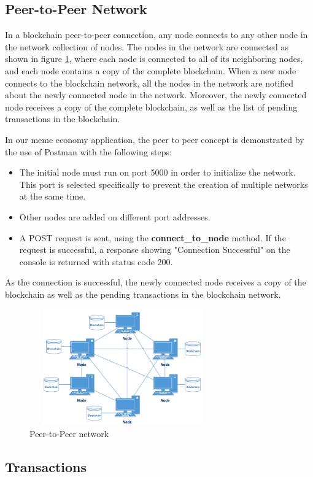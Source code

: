\documentclass[12pt]{article}
\begin{document}
\subsection{Peer-to-Peer Network} %
In a blockchain peer-to-peer connection, any node connects to any other node in the network collection of nodes. The nodes in the network are connected as shown in figure \ref{fig:P2P}, where each node is connected to all of its neighboring nodes, and each node contains a copy of the complete blockchain. When a new node connects to the blockchain network, all the nodes in the network are notified about the newly connected node in the network. Moreover, the newly connected node receives a copy of the complete blockchain, as well as the list of pending transactions in the blockchain. 

In our meme economy application, the peer to peer concept is demonstrated by the use of Postman with the following steps:
\begin{itemize}
    \item The initial node must run on port 5000 in order to initialize the network. This port is selected specifically to prevent the creation of multiple networks at the same time.
    \item Other nodes are added on different port addresses.
    \item A POST request is sent, using the \textbf{connect\_to\_node} method. If the request is successful, a response showing "Connection Successful" on the console is returned with status code 200.
\end{itemize}

As the connection is successful, the newly connected node receives a copy of the blockchain as well as the pending transactions in the blockchain network.
\begin{figure}[H]
    \centering
    \includegraphics[width=8cm, height=5cm]{../report_MemeEcon/images/p2p.png}
    \caption{Peer-to-Peer network}
    \label{fig:P2P}
\end{figure}
\subsection{Transactions} %
\end{document}
